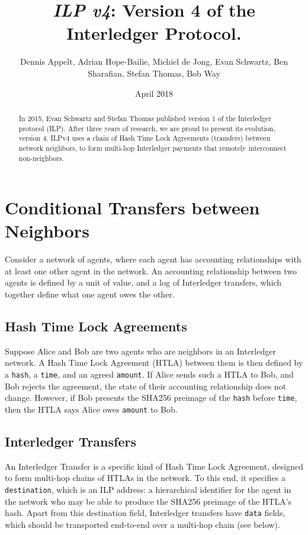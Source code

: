\documentclass[11pt,twoside,a4paper]{article}
\begin{document}
\title{{\em ILP v4}: Version 4 of the Interledger Protocol.}
\author{Dennis Appelt, Adrian Hope-Bailie, Michiel de Jong, Evan Schwartz, Ben Sharafian, Stefan Thomas, Bob Way}
\date{April 2018}
\maketitle
\begin{abstract}
In 2015, Evan Schwartz and Stefan Thomas published version 1 of the Interledger protocol (ILP). After three years of research,
we are proud to present its evolution, version 4. ILPv4 uses a chain of Hash Time Lock Agreements (transfers) between network neighbors, to form
multi-hop Interledger payments that remotely interconnect non-neighbors.
\end{abstract}

\section{Conditional Transfers between Neighbors}
Consider a network of agents, where each agent has accounting relationships with at least one other agent in the network. An accounting
relationship between two agents is defined by a unit of value, and a log of Interledger transfers, which together define what one agent owes the other.

\subsection{Hash Time Lock Agreements}
Suppose Alice and Bob are two agents who are neighbors in an Interledger network. A Hash Time Lock Agreement (HTLA) between them is then
defined by a {\tt hash}, a {\tt time},  and an agreed {\tt amount}. If Alice sends such a HTLA to Bob, and Bob rejects the agreement, the state of their accounting
relationship does not change. However, if Bob presents the SHA256 preimage of the {\tt hash} before {\tt time}, then the HTLA says Alice owes {\tt amount} to Bob.

\subsection{Interledger Transfers}
An Interledger Transfer is a specific kind of Hash Time Lock Agreement, designed to form multi-hop chains of HTLAs in the network. To this end,
it specifies a {\tt destination}, which is an ILP address: a hierarchical identifier for the agent in the network who may be able to produce the SHA256 preimage of the
HTLA's hash. Apart from this destination field, Interledger transfers have {\tt data} fields, which should be transported end-to-end over a multi-hop chain (see below).
\end{document}
